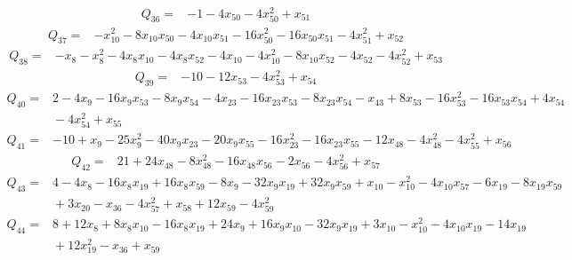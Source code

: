 {\begin{align*}
\end{align*}
\begin{align*}
 Q_{36}={}&-1 -4x_{50} -4x_{50}^{2} +x_{51}
\end{align*}
\begin{align*}
 Q_{37}={}&-x_{10}^{2} -8x_{10}x_{50} -4x_{10}x_{51} -16x_{50}^{2} -16x_{50}x_{51} -4x_{51}^{2} +x_{52}
\end{align*}
\begin{align*}
 Q_{38}={}&-x_{8} -x_{8}^{2} -4x_{8}x_{10} -4x_{8}x_{52} -4x_{10} -4x_{10}^{2} -8x_{10}x_{52} -4x_{52} -4x_{52}^{2} +x_{53}
\end{align*}
\begin{align*}
 Q_{39}={}&-10 -12x_{53} -4x_{53}^{2} +x_{54}
\end{align*}
\begin{align*}
 Q_{40}={}&2 -4x_{9} -16x_{9}x_{53} -8x_{9}x_{54} -4x_{23} -16x_{23}x_{53} -8x_{23}x_{54} -x_{43} +8x_{53} -16x_{53}^{2} -16x_{53}x_{54} +4x_{54}\\
 &{}-4x_{54}^{2} +x_{55}
\end{align*}
\begin{align*}
 Q_{41}={}&-10 +x_{9} -25x_{9}^{2} -40x_{9}x_{23} -20x_{9}x_{55} -16x_{23}^{2} -16x_{23}x_{55} -12x_{48} -4x_{48}^{2} -4x_{55}^{2} +x_{56}
\end{align*}
\begin{align*}
 Q_{42}={}&21 +24x_{48} -8x_{48}^{2} -16x_{48}x_{56} -2x_{56} -4x_{56}^{2} +x_{57}
\end{align*}
\begin{align*}
 Q_{43}={}&4 -4x_{8} -16x_{8}x_{19} +16x_{8}x_{59} -8x_{9} -32x_{9}x_{19} +32x_{9}x_{59} +x_{10} -x_{10}^{2} -4x_{10}x_{57} -6x_{19} -8x_{19}x_{59}\\
 &{}+3x_{20} -x_{36} -4x_{57}^{2} +x_{58} +12x_{59} -4x_{59}^{2}
\end{align*}
\begin{align*}
 Q_{44}={}&8 +12x_{8} +8x_{8}x_{10} -16x_{8}x_{19} +24x_{9} +16x_{9}x_{10} -32x_{9}x_{19} +3x_{10} -x_{10}^{2} -4x_{10}x_{19} -14x_{19}\\
 &{}+12x_{19}^{2} -x_{36} +x_{59}
\end{align*}
}
